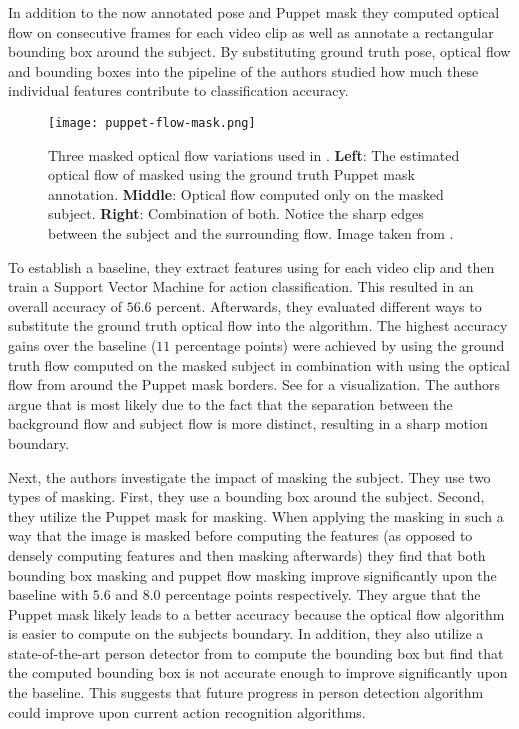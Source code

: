 In addition to the now annotated pose and Puppet mask they computed optical flow on consecutive frames for each video clip as well as annotate a rectangular bounding box around the subject.
By substituting ground truth pose, optical flow and bounding boxes into the pipeline of \cite{wang_dense_2013} the authors studied how much these individual features contribute to classification accuracy.

\begin{figure}[htb!]
    \centering
    \texttt{[image: puppet-flow-mask.png]}
    \caption{Three masked optical flow variations used in \cite{jhuang_towards_2013}. \textbf{Left}: The estimated optical flow of \cite{wang_dense_2013} masked using the ground truth Puppet mask annotation. \textbf{Middle}: Optical flow computed only on the masked subject. \textbf{Right}: Combination of both. Notice the sharp edges between the subject and the surrounding flow. Image taken from \cite{jhuang_towards_2013}. }
    \label{fig:puppet-flow-mask}
\end{figure}

To establish a baseline, they extract features using \cite{wang_dense_2013} for each video clip and then train a Support Vector Machine for action classification.
This resulted in an overall accuracy of $56.6$ percent.
Afterwards, they evaluated different ways to substitute the ground truth optical flow into the algorithm.
The highest accuracy gains over the baseline ($11$ percentage points) were achieved by using the ground truth flow computed on the masked subject in combination with using the optical flow from around the Puppet mask borders.
See  for a visualization.
The authors argue that is most likely due to the fact that the separation between the background flow and subject flow is more distinct, resulting in a sharp motion boundary. 

Next, the authors investigate the impact of masking the subject. 
They use two types of masking. First, they use a bounding box around the subject. Second, they utilize the Puppet mask for masking. 
When applying the masking in such a way that the image is masked before computing the features (as opposed to densely computing features and then masking afterwards) they find that both bounding box masking and puppet flow masking improve significantly upon the baseline with $5.6$ and $8.0$ percentage points respectively.
They argue that the Puppet mask likely leads to a better accuracy because the optical flow algorithm is easier to compute on the subjects boundary.
In addition, they also utilize a state-of-the-art person detector from \cite{bourdev_detecting_2010} to compute the bounding box but find that the computed bounding box is not accurate enough to improve significantly upon the baseline.
This suggests that future progress in person detection algorithm could improve upon current action recognition algorithms.

